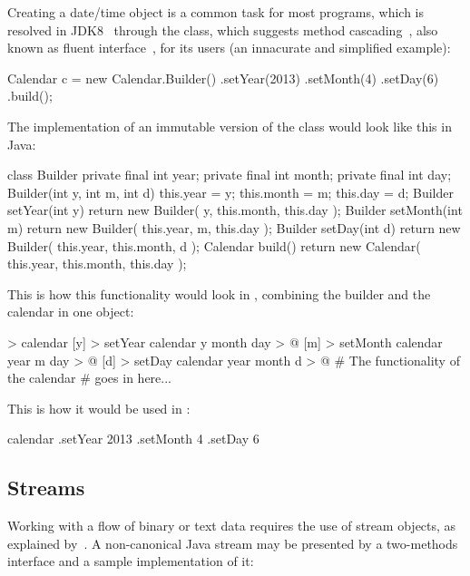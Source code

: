 Creating a date/time object is a common task for most programs, which
is resolved in JDK8~\citep{jdk8} through the  class,
which suggests method cascading~\citep{beck1997smalltalk},
also known as fluent interface~\citep{fluentinterface}, for its users
(an innacurate and simplified example):

\begin{ffcode}
Calendar c = new Calendar.Builder()
  .setYear(2013)
  .setMonth(4)
  .setDay(6)
  .build();
\end{ffcode}

The implementation of an immutable version of the 
class would look like this in Java:

\begin{ffcode}
class Builder {
  private final int year;
  private final int month;
  private final int day;
  Builder(int y, int m, int d) {
    this.year = y;
    this.month = m;
    this.day = d;
  }
  Builder setYear(int y) {
    return new Builder(
      y, this.month, this.day
    );
  }
  Builder setMonth(int m) {
    return new Builder(
      this.year, m, this.day
    );
  }
  Builder setDay(int d) {
    return new Builder(
      this.year, this.month, d
    );
  }
  Calendar build() {
    return new Calendar(
      this.year, this.month, this.day
    );
  }
}
\end{ffcode}

This is how this functionality would look in \eo{}, combining
the builder and the calendar in one object:

\begin{ffcode}
 > calendar
  [y] > setYear
    calendar y month day > @
  [m] > setMonth
    calendar year m day > @
  [d] > setDay
    calendar year month d > @
  # The functionality of the calendar
  # goes in here...
\end{ffcode}

This is how it would be used in \eo{}:

\begin{ffcode}
calendar
.setYear 2013
.setMonth 4
.setDay 6
\end{ffcode}

\subsection{Streams}

Working with a flow of binary or text data requires the use
of stream objects, as explained by~\citet[p.226]{metsker2002}.
A non-canonical Java stream may be presented by
a two-methods interface and a sample implementation of it:

